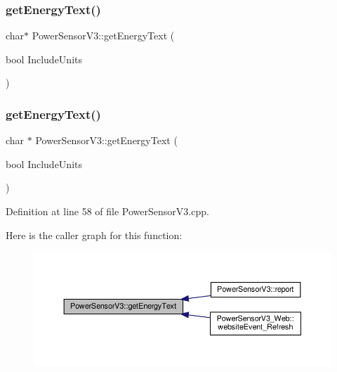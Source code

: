 \mbox{\label{class_power_sensor_v3_aa2d8c1dc0dd771e56eea4644b1a1b204}} 
\subsubsection{\texorpdfstring{get\+Energy\+Text()}{getEnergyText()}\hspace{0.1cm}{\footnotesize\ttfamily [1/2]}}
{\footnotesize\ttfamily char$\ast$ Power\+Sensor\+V3\+::get\+Energy\+Text (\begin{DoxyParamCaption}\item[{bool}]{Include\+Units }\end{DoxyParamCaption})}

\mbox{\label{class_power_sensor_v3_a63517e9f76afef5ee7da103cc46abc84}} 
\subsubsection{\texorpdfstring{get\+Energy\+Text()}{getEnergyText()}\hspace{0.1cm}{\footnotesize\ttfamily [2/2]}}
{\footnotesize\ttfamily char $\ast$ Power\+Sensor\+V3\+::get\+Energy\+Text (\begin{DoxyParamCaption}\item[{bool}]{Include\+Units }\end{DoxyParamCaption})}



Definition at line 58 of file Power\+Sensor\+V3.\+cpp.

Here is the caller graph for this function\+:
\nopagebreak
\begin{figure}[H]
\begin{center}
\leavevmode
\includegraphics[width=350pt]{class_power_sensor_v3_a63517e9f76afef5ee7da103cc46abc84_icgraph}
\end{center}
\end{figure}
\mbox{\label{class_power_sensor_v3_adc5ce409d7bf0b6dac4d65fa64619bdb}} 
